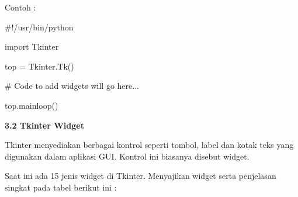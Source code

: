 \documentclass[a4paper,12pt]{report}
\begin{document}


\newpage

\vspace{12pt}
\vspace{12pt}
\noindent 
Contoh : \par
\noindent 
{\fontsize{10pt}{10pt}\selectfont  $  \#  $!/usr/bin/python} \par
\vspace{10pt}
\noindent 
{\fontsize{10pt}{10pt}\selectfont import Tkinter} \par
\noindent 
{\fontsize{10pt}{10pt}\selectfont top = Tkinter.Tk()} \par
\noindent 
{\fontsize{10pt}{10pt}\selectfont   $  \#  $ Code to add widgets will go here...} \par
\noindent 
{\fontsize{10pt}{10pt}\selectfont top.mainloop()} \par
\vspace{10pt}
\noindent 
\textbf{3.2 Tkinter Widget} \par
\noindent 
 \hspace*{0.5in} Tkinter menyediakan berbagai kontrol seperti tombol, label dan kotak teks yang digunakan dalam aplikasi GUI. Kontrol ini biasanya disebut widget.  \par
\noindent 
 \hspace*{0.5in} Saat ini ada 15 jenis widget di Tkinter. Menyajikan widget serta penjelasan singkat pada tabel berikut ini : \par


\end{document}
